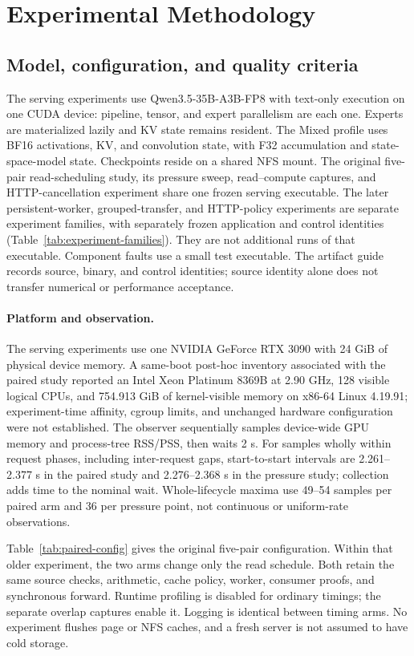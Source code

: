 \section{Experimental Methodology}
\label{sec:eval-setup}

\subsection{Model, configuration, and quality criteria}
The serving experiments use Qwen3.5-35B-A3B-FP8 with text-only execution on
one CUDA device: pipeline, tensor, and expert parallelism are each one.
Experts are materialized lazily and KV state remains resident. The Mixed
profile uses BF16 activations, KV, and convolution state, with F32 accumulation
and state-space-model state. Checkpoints reside on a shared NFS mount.
The original five-pair read-scheduling study, its pressure sweep, read--compute
captures, and HTTP-cancellation experiment share one frozen serving executable.
The later persistent-worker, grouped-transfer, and HTTP-policy experiments
are separate experiment families, with separately frozen application and
control identities (Table~\ref{tab:experiment-families}). They are not
additional runs of that executable. Component faults use a small test
executable. The artifact guide records source, binary, and control identities;
source identity alone does not transfer numerical or performance acceptance.

\paragraph{Platform and observation.}
The serving experiments use one NVIDIA GeForce RTX 3090 with 24 GiB of
physical device memory. A same-boot post-hoc inventory associated with the
paired study reported an Intel Xeon Platinum 8369B at 2.90 GHz, 128 visible
logical CPUs, and 754.913 GiB of kernel-visible memory on x86-64 Linux
4.19.91; experiment-time affinity, cgroup limits, and unchanged hardware
configuration were not established. The observer sequentially samples device-wide GPU
memory and process-tree RSS/PSS, then waits 2 s. For samples wholly within
request phases, including inter-request gaps, start-to-start intervals are
2.261--2.377 s in the
paired study and 2.276--2.368 s in the pressure study; collection adds time
to the nominal wait. Whole-lifecycle maxima use 49--54 samples per paired
arm and 36 per pressure point, not continuous or uniform-rate observations.

Table~\ref{tab:paired-config} gives the original five-pair configuration.
Within that older experiment, the two arms change only the read schedule.
Both retain the same source checks, arithmetic,
cache policy, worker, consumer proofs, and synchronous forward. Runtime
profiling is disabled for ordinary timings; the separate overlap captures
enable it. Logging is identical between timing arms. No experiment flushes
page or NFS caches, and a fresh server is not assumed to have cold storage.

